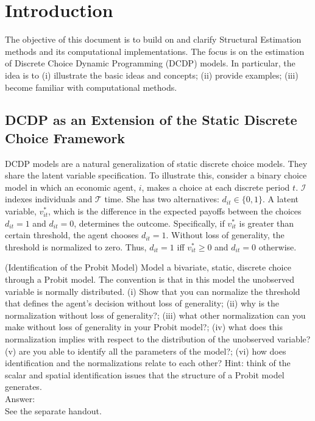 \section{Introduction} \label{section:intro}
\noindent The objective of this document is to build on \citet{keane2011structural} and clarify Structural Estimation methods and its computational implementations. The focus is on the estimation of Discrete Choice Dynamic Programming (DCDP) models. In particular, the idea is to (i) illustrate the basic ideas and concepts; (ii) provide examples; (iii) become familiar with computational methods.\\

\subsection{DCDP as an Extension of the Static Discrete Choice Framework} \label{section:extension}
DCDP models are a natural generalization of static discrete choice models. They share the latent variable specification. To illustrate this, consider a binary choice model in which an economic agent, $i$, makes a choice at each discrete period $t$. $\mathcal{I}$ indexes individuals and $\mathcal{T}$ time. She has two alternatives: $d_{it} \in \{ 0,1\}$. A latent variable, $v_{it}^*$, which is the difference in the expected payoffs between the choices $d_{it} = 1$ and $d_{it} = 0$, determines the outcome. Specifically, if $v_{it}^*$ is greater than certain threshold, the agent chooses $d_{it} = 1$. Without loss of generality, the threshold is normalized to zero. Thus, $d_{it} = 1$ iff $v_{it}^* \geq 0$ and $d_{it} = 0$ otherwise.\\
\begin{exercise} (Identification of the Probit Model) \label{exercise:idenprobit}
Model a bivariate, static, discrete choice through a Probit model. The convention is that in this model the unobserved variable is normally distributed. (i) Show that you can normalize the threshold that defines the agent's decision without loss of generality;  (ii) why is the normalization without loss of generality?; (iii) what other normalization can you make without loss of generality in your Probit model?; (iv) what does this normalization implies with respect to the distribution of the unobserved variable? (v) are you able to identify all the parameters of the model?; (vi) how does identification and the normalizations relate to each other? Hint: think of the scalar and spatial identification issues that the structure of a Probit model generates.\\
\noindent Answer:\\
\noindent See the separate handout. 
\end{exercise}

